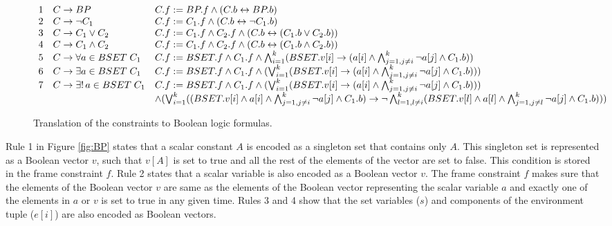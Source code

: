 \begin{figure*}[t]
\[
\begin{array}{lll}
1 & C \rightarrow  BP &
        C.f := BP.f \wedge
        (C.b \leftrightarrow BP.b) \\
2 & C \rightarrow  \neg C_1 &
        C.f := C_1.f \wedge
        (C.b \leftrightarrow \neg C_1.b) \\
3 & C \rightarrow  C_1 \vee C_2 &
        C.f := C_1.f \wedge C_2.f \wedge
        (C.b \leftrightarrow (C_1.b \vee C_2.b)) \\
4 & C \rightarrow  C_1 \wedge C_2 &
        C.f := C_1.f \wedge C_2.f \wedge
        (C.b \leftrightarrow (C_1.b \wedge C_2.b)) \\
5 & C \rightarrow  \forall a \in BSET \; C_1  &
        C.f := BSET.f \wedge C_1.f \wedge
        \bigwedge_{i=1}^k (BSET.v[i] \rightarrow
         (a[i] \wedge \bigwedge_{j=1,j \neq i}^k \neg a[j] \wedge C_1.b)) \\
6 & C \rightarrow  \exists a \in BSET \; C_1  &
        C.f :=  BSET.f \wedge C_1.f \wedge
        (\bigvee_{i=1}^k (BSET.v[i] \rightarrow
        (a[i] \wedge \bigwedge_{j=1,j \neq i}^k \neg a[j] \wedge C_1.b))) \\
7 & C \rightarrow  \exists ! \, a \in BSET \; C_1  &
  C.f := BSET.f \wedge C_1.f \wedge
  (\bigvee_{i=1}^k (BSET.v[i] \rightarrow
   (a[i] \wedge \bigwedge_{j=1,j \neq i}^k \neg a[j] \wedge C_1.b))) \\
   & & \wedge (\bigvee_{i=1}^k ((BSET.v[i] \wedge
   a[i] \wedge \bigwedge_{j=1,j \neq i}^k \neg a[j] \wedge C_1.b) 
   \rightarrow \neg \bigwedge_{l=1, l \neq i}^k (BSET.v[l] \wedge
   a[l] \wedge \bigwedge_{j=1,j \neq l}^k \neg a[j] \wedge C_1.b)))
\end{array}
\]
\caption{Translation of the constraints to Boolean logic formulas.}
\label{fig:C}
\end{figure*}

Rule 1 in Figure \ref{fig:BP} states that a scalar constant $A$
is encoded as a singleton set that contains only $A$. This singleton
set is represented as a Boolean vector $v$, such that 
$v[A]$ is set to true and all the rest of the elements of the vector
are set to false. This condition is stored in the frame constraint $f$.
Rule 2 states that a scalar variable is also encoded as a Boolean vector $v$.
The frame constraint $f$ makes sure that the elements of the Boolean vector $v$
are same as the elements of the Boolean vector representing the scalar
variable $a$ and exactly one of the elements in $a$ or $v$ is set to true
in any given time.
Rules 3 and 4 show that the set variables ($s$) and components of the
environment tuple ($e[i]$) are also encoded as Boolean vectors.

